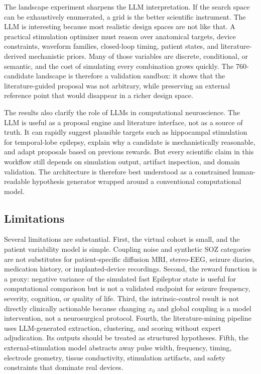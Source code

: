 \documentclass{article}
\begin{document}
The landscape experiment sharpens the LLM interpretation. If the search space can be exhaustively enumerated, a grid is the better scientific instrument. The LLM is interesting because most realistic design spaces are not like that. A practical stimulation optimizer must reason over anatomical targets, device constraints, waveform families, closed-loop timing, patient states, and literature-derived mechanistic priors. Many of those variables are discrete, conditional, or semantic, and the cost of simulating every combination grows quickly. The 760-candidate landscape is therefore a validation sandbox: it shows that the literature-guided proposal was not arbitrary, while preserving an external reference point that would disappear in a richer design space.

The results also clarify the role of LLMs in computational neuroscience. The LLM is useful as a proposal engine and literature interface, not as a source of truth. It can rapidly suggest plausible targets such as hippocampal stimulation for temporal-lobe epilepsy, explain why a candidate is mechanistically reasonable, and adapt proposals based on previous rewards. But every scientific claim in this workflow still depends on simulation output, artifact inspection, and domain validation. The architecture is therefore best understood as a constrained human-readable hypothesis generator wrapped around a conventional computational model.

\subsection{Limitations}
Several limitations are substantial. First, the virtual cohort is small, and the patient variability model is simple. Coupling noise and synthetic SOZ categories are not substitutes for patient-specific diffusion MRI, stereo-EEG, seizure diaries, medication history, or implanted-device recordings. Second, the reward function is a proxy: negative variance of the simulated fast Epileptor state is useful for computational comparison but is not a validated endpoint for seizure frequency, severity, cognition, or quality of life. Third, the intrinsic-control result is not directly clinically actionable because changing $x_0$ and global coupling is a model intervention, not a neurosurgical protocol. Fourth, the literature-mining pipeline uses LLM-generated extraction, clustering, and scoring without expert adjudication. Its outputs should be treated as structured hypotheses. Fifth, the external-stimulation model abstracts away pulse width, frequency, timing, electrode geometry, tissue conductivity, stimulation artifacts, and safety constraints that dominate real devices.
\end{document}
